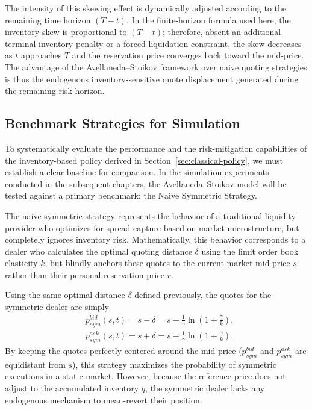 The intensity of this skewing effect is dynamically adjusted according to the remaining time horizon $(T-t)$. In the finite-horizon formula used here, the inventory skew is proportional to $(T-t)$; therefore, absent an additional terminal inventory penalty or a forced liquidation constraint, the skew decreases as $t$ approaches $T$ and the reservation price converges back toward the mid-price. The advantage of the Avellaneda--Stoikov framework over naive quoting strategies is thus the endogenous inventory-sensitive quote displacement generated during the remaining risk horizon.

\subsection{Benchmark Strategies for Simulation}

To systematically evaluate the performance and the risk-mitigation capabilities of the inventory-based policy derived in Section~\ref{sec:classical-policy}, we must establish a clear baseline for comparison. In the simulation experiments conducted in the subsequent chapters, the Avellaneda--Stoikov model will be tested against a primary benchmark: the Naive Symmetric Strategy.

The naive symmetric strategy represents the behavior of a traditional liquidity provider who optimizes for spread capture based on market microstructure, but completely ignores inventory risk. Mathematically, this behavior corresponds to a dealer who calculates the optimal quoting distance $\delta$ using the limit order book elasticity $k$, but blindly anchors these quotes to the current market mid-price $s$ rather than their personal reservation price $r$.

Using the same optimal distance $\delta$ defined previously, the quotes for the symmetric dealer are simply
\begin{align*}
    &p^{bid}_{sym}(s,t) = s - \delta = s - \frac{1}{\gamma} \ln \left( 1 + \frac{\gamma}{k} \right),\\
    &p^{ask}_{sym}(s,t) = s + \delta = s + \frac{1}{\gamma} \ln \left( 1 + \frac{\gamma}{k} \right).
\end{align*}
By keeping the quotes perfectly centered around the mid-price ($p^{bid}_{sym}$ and $p^{ask}_{sym}$ are equidistant from $s$), this strategy maximizes the probability of symmetric executions in a static market. However, because the reference price does not adjust to the accumulated inventory $q$, the symmetric dealer lacks any endogenous mechanism to mean-revert their position. 

